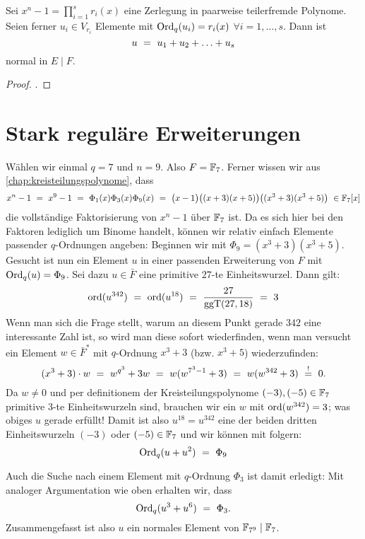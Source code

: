 \begin{kor}
  \label{kor:summe_erzeuger_normal}
  Sei $x^n-1 = \prod_{i=1}^s r_i(x)$ eine Zerlegung in paarweise teilerfremde
  Polynome. Seien ferner $u_i \in V_{r_i}$ Elemente mit 
  $\operatorname{Ord}_q(u_i) = r_i(x)$ $\forall i=1,\ldots,s$. Dann ist
  \[ u \ =\  u_1 + u_2 + \ldots + u_s\]
  normal in $E \mid F$.
\end{kor}
\begin{proof}
  .
\end{proof}

\section{Stark reguläre Erweiterungen}
\label{sec:stark_regulare_erweiterungen}

\begin{beispiel}
  \label{bsp:stark_regular_1}
  Wählen wir einmal $q = 7$ und $n=9$. Also $F = \mathbb{F}_7$.
  Ferner wissen wir aus \autoref{chap:kreisteilungspolynome}, dass
  \[ x^n-1 \ =\  x^9-1 \ =\  
    \Phi_1(x)\Phi_3(x)\Phi_9(x) \ =\ 
    \big(x-1\big)\big( (x+3)(x+5)\big)
    \big( (x^3+3)(x^3+5) \big) \ \in \mathbb{F}_7[x]\]
  die vollständige Faktorisierung von $x^n-1$ über $\mathbb{F}_7$ ist.
  Da es sich hier bei den Faktoren lediglich um Binome handelt, können wir
  relativ einfach Elemente passender $q$-Ordnungen angeben: Beginnen wir 
  mit $\Phi_9 = (x^3+3)(x^3+5)$. Gesucht ist nun ein Element $u$ in einer 
  passenden Erweiterung von $F$ mit $\operatorname{Ord}_q(u)= \Phi_9$.
  Sei dazu $u \in \bar F$ eine primitive $27$-te Einheitswurzel. Dann
  gilt:
  \[ \operatorname{ord}(u^{342}) \ =\  \operatorname{ord}(u^{18}) \ =\  \frac{27}{\operatorname{ggT}(27,18)} \ =\  3\]
  Wenn man sich die Frage stellt, warum an diesem Punkt gerade $342$ eine
  interessante Zahl ist, so wird man diese sofort wiederfinden, wenn man
  versucht ein Element $w\in \bar F^\ast$ mit $q$-Ordnung $x^3+3$ (bzw.
  $x^3+5$) wiederzufinden:
  \[ (x^3+3)\cdot w \ =\  w^{q^3} + 3 w \ =\  
    w(w^{7^3-1} +3) \ =\  w(w^{342}+3) \ \overset{!}{=}\  0.\]
  Da $w \neq 0$ und per definitionem der Kreisteilungspolynome 
  $(-3),(-5)\in \mathbb{F}_7$ primitive $3$-te Einheitswurzeln sind, 
  brauchen wir ein $w$ mit $\operatorname{ord}(w^{342}) = 3$; 
  was obiges $u$ gerade erfüllt! Damit ist also $u^{18} = u^{342}$ 
  eine der beiden dritten Einheitswurzeln $(-3)$ oder $(-5) \in \mathbb{F}_7$ und wir
  können mit  folgern:
  \[ \operatorname{Ord}_q(u + u^2) \ =\  \Phi_9\]

  Auch die Suche nach einem Element mit $q$-Ordnung $\Phi_3$ ist damit
  erledigt: Mit analoger Argumentation wie oben erhalten wir, dass 
  \[ \operatorname{Ord}_q(u^{3} + u^{6}) \ =\  \Phi_3.\]
  Zusammengefasst ist also $u$ ein normales Element von $\mathbb{F}_{7^9} \mid \mathbb{F}_7$.
\end{beispiel}

